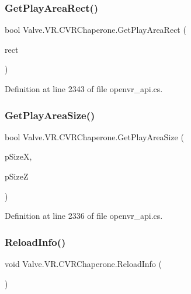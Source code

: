 \subsubsection{\texorpdfstring{GetPlayAreaRect()}{GetPlayAreaRect()}}
{\footnotesize\ttfamily bool Valve.\+V\+R.\+C\+V\+R\+Chaperone.\+Get\+Play\+Area\+Rect (\begin{DoxyParamCaption}\item[{ref \mbox{\hyperlink{struct_valve_1_1_v_r_1_1_hmd_quad__t}{Hmd\+Quad\+\_\+t}}}]{rect }\end{DoxyParamCaption})}



Definition at line 2343 of file openvr\+\_\+api.\+cs.

\mbox{\label{class_valve_1_1_v_r_1_1_c_v_r_chaperone_a9f3098d79daba1782c0fa532b9332c27}} 
\subsubsection{\texorpdfstring{GetPlayAreaSize()}{GetPlayAreaSize()}}
{\footnotesize\ttfamily bool Valve.\+V\+R.\+C\+V\+R\+Chaperone.\+Get\+Play\+Area\+Size (\begin{DoxyParamCaption}\item[{ref float}]{p\+SizeX,  }\item[{ref float}]{p\+SizeZ }\end{DoxyParamCaption})}



Definition at line 2336 of file openvr\+\_\+api.\+cs.

\mbox{\label{class_valve_1_1_v_r_1_1_c_v_r_chaperone_afdb36eb8bc9ea53762ee6917b25f3c9b}} 
\subsubsection{\texorpdfstring{ReloadInfo()}{ReloadInfo()}}
{\footnotesize\ttfamily void Valve.\+V\+R.\+C\+V\+R\+Chaperone.\+Reload\+Info (\begin{DoxyParamCaption}{ }\end{DoxyParamCaption})}



